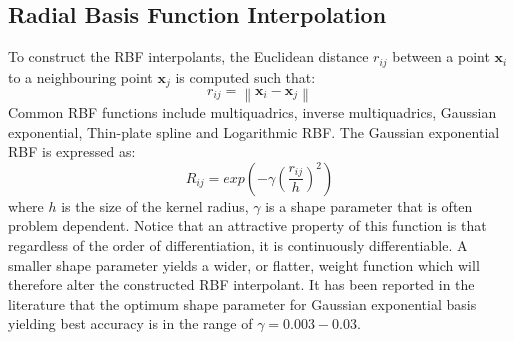 \documentclass[12pt]{extarticle}
\begin{document}
\subsection{Radial Basis Function Interpolation}
To construct the RBF interpolants, the Euclidean distance $r_{ij}$ between a point $\textbf{x}_i$ to a neighbouring point $\textbf{x}_j$ is computed such that:
\begin{equation} 
    r_{ij} = \left\| \textbf{x}_i - \textbf{x}_j \right\|
  \label{eq026}
\end{equation}
Common RBF functions include multiquadrics, inverse multiquadrics, Gaussian exponential, Thin-plate spline and Logarithmic RBF. The Gaussian exponential RBF is expressed as:
\begin{equation} 
    R_{ij} = exp(-\gamma(\frac{r_{ij}}{h})^{2})   
  \label{eq027}
\end{equation}
where $h$ is the size of the kernel radius, $\gamma$ is a shape parameter that is often problem dependent. Notice that an attractive property of this function is that regardless of the order of differentiation, it is continuously differentiable. A smaller shape parameter yields a wider, or flatter, weight function which will therefore alter the constructed RBF interpolant. It has been reported in the literature that the optimum shape parameter for Gaussian exponential basis yielding best accuracy is in the range of $\gamma = 0.003-0.03$.
\end{document}
